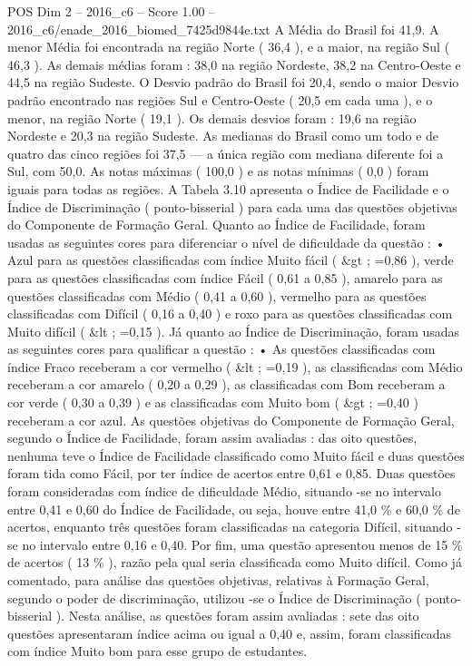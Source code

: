 \begin{textsample}{POS Dim 2 – 2016\_c6 – Score 1.00 – 2016\_c6/enade\_2016\_biomed\_7425d9844e.txt}
A Média do Brasil foi 41,9.
A menor Média foi encontrada na região Norte ( 36,4 ), e a maior, na região Sul ( 46,3 ).
As demais médias foram : 38,0 na região Nordeste, 38,2 na Centro-Oeste e 44,5 na região Sudeste.
O Desvio padrão do Brasil foi 20,4, sendo o maior Desvio padrão encontrado nas regiões Sul e Centro-Oeste ( 20,5 em cada uma ), e o menor, na região Norte ( 19,1 ).
Os demais desvios foram : 19,6 na região Nordeste e 20,3 na região Sudeste.
As medianas do Brasil como um todo e de quatro das cinco regiões foi 37,5 — a única região com mediana diferente foi a Sul, com 50,0.
As notas máximas ( 100,0 ) e as notas mínimas ( 0,0 ) foram iguais para todas as regiões.
A Tabela 3.10 apresenta o Índice de Facilidade e o Índice de Discriminação ( ponto-bisserial ) para cada uma das questões objetivas do Componente de Formação Geral.
Quanto ao Índice de Facilidade, foram usadas as seguintes cores para diferenciar o nível de dificuldade da questão : • Azul para as questões classificadas com índice Muito fácil ( \&gt ; =0,86 ), verde para as questões classificadas com índice Fácil ( 0,61 a 0,85 ), amarelo para as questões classificadas com Médio ( 0,41 a 0,60 ), vermelho para as questões classificadas com Difícil ( 0,16 a 0,40 ) e roxo para as questões classificadas com Muito difícil ( \&lt ; =0,15 ).
Já quanto ao Índice de Discriminação, foram usadas as seguintes cores para qualificar a questão : • As questões classificadas com índice Fraco receberam a cor vermelho ( \&lt ; =0,19 ), as classificadas com Médio receberam a cor amarelo ( 0,20 a 0,29 ), as classificadas com Bom receberam a cor verde ( 0,30 a 0,39 ) e as classificadas com Muito bom ( \&gt ; =0,40 ) receberam a cor azul.
As questões objetivas do Componente de Formação Geral, segundo o Índice de Facilidade, foram assim avaliadas : das oito questões, nenhuma teve o Índice de Facilidade classificado como Muito fácil e duas questões foram tida como Fácil, por ter índice de acertos entre 0,61 e 0,85.
Duas questões foram consideradas com índice de dificuldade Médio, situando -se no intervalo entre 0,41 e 0,60 do Índice de Facilidade, ou seja, houve entre 41,0 \% e 60,0 \% de acertos, enquanto três questões foram classificadas na categoria Difícil, situando -se no intervalo entre 0,16 e 0,40.
Por fim, uma questão apresentou menos de 15 \% de acertos ( 13 \% ), razão pela qual seria classificada como Muito difícil.
Como já comentado, para análise das questões objetivas, relativas à Formação Geral, segundo o poder de discriminação, utilizou -se o Índice de Discriminação ( ponto-bisserial ).
Nesta análise, as questões foram assim avaliadas : sete das oito questões apresentaram índice acima ou igual a 0,40 e, assim, foram classificadas com índice Muito bom para esse grupo de estudantes.

\end{textsample}
